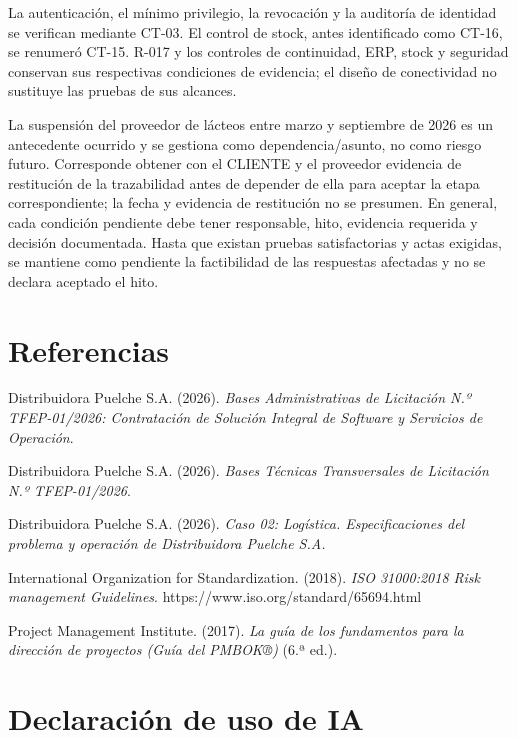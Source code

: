 La autenticación, el mínimo privilegio, la revocación y la auditoría de identidad se verifican mediante CT-03. El control de stock, antes identificado como CT-16, se renumeró CT-15. R-017 y los controles de continuidad, ERP, stock y seguridad conservan sus respectivas condiciones de evidencia; el diseño de conectividad no sustituye las pruebas de sus alcances.

La suspensión del proveedor de lácteos entre marzo y septiembre de 2026 es un antecedente ocurrido y se gestiona como dependencia/asunto, no como riesgo futuro. Corresponde obtener con el CLIENTE y el proveedor evidencia de restitución de la trazabilidad antes de depender de ella para aceptar la etapa correspondiente; la fecha y evidencia de restitución no se presumen. En general, cada condición pendiente debe tener responsable, hito, evidencia requerida y decisión documentada. Hasta que existan pruebas satisfactorias y actas exigidas, se mantiene como pendiente la factibilidad de las respuestas afectadas y no se declara aceptado el hito.

\newpage

\section*{Referencias}

\begingroup
\small\setlength{\parindent}{-0.5in}\setlength{\leftskip}{0.5in}\setlength{\parskip}{3pt}
Distribuidora Puelche S.A. (2026). \emph{Bases Administrativas de Licitación N.º TFEP-01/2026: Contratación de Solución Integral de Software y Servicios de Operación}.

Distribuidora Puelche S.A. (2026). \emph{Bases Técnicas Transversales de Licitación N.º TFEP-01/2026}.

Distribuidora Puelche S.A. (2026). \emph{Caso 02: Logística. Especificaciones del problema y operación de Distribuidora Puelche S.A.}

International Organization for Standardization. (2018). \emph{ISO 31000:2018 Risk management \textemdash{} Guidelines}. https://www.iso.org/standard/65694.html








Project Management Institute. (2017). \emph{La guía de los fundamentos para la dirección de proyectos (Guía del PMBOK®)} (6.ª ed.).
\endgroup

\section*{Declaración de uso de IA}

